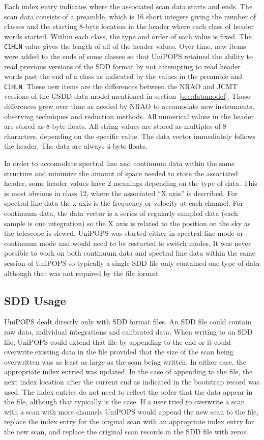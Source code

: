 \documentclass[final,authoryear,5p,times,twocolumn]{elsarticle}
\begin{document}
Each index entry indicates where the associated scan data starts and
ends.  The scan data consists of a preamble, which is 16 short
integers giving the number of classes and the starting 8-byte location
in the header where each class of header words started.  Within each
class, the type and order of each value is fixed.  The \texttt{C1HLN}
value gives the length of all of the header values.  Over time, new
items were added to the ends of some classes so that UniPOPS retained
the ability to read previous versions of the SDD format by not
attempting to read header words past the end of a class as indicated
by the values in the preamble and \texttt{C1HLN}.  These new items are the 
differences between the NRAO and JCMT versions of the GSDD data model
mentioned in section~\ref{sec:datamodel}.  Those differences grew over time
as needed by NRAO to accomodate new instruments, observing techniques and
reduction methods. All numerical
values in the header are stored as 8-byte floats.  All string values
are stored as multiples of 8 characters, depending on the specific
value.  The data vector immediately follows the header.  The data are
always 4-byte floats.

In order to accomodate spectral line and continuum data within the
same structure and minimize the amount of space needed to store the
associated header, some header values have 2 meanings depending on the
type of data.  This is most obvious in class 12, where the associated
``X axis'' is described.  For spectral line data the x-axis is the
frequency or velocity at each channel.  For
continuum data, the data vector is a series of regularly sampled
data (each sample is one integration) so the X axis is related to
the position on the sky as the telescope is slewed.  UniPOPS was
started either in spectral line mode or continuum mode and would need
to be restarted to switch modes.  It was never possible to work on
both continuum data and spectral line data within the same session of
UniPOPS so typically a single SDD file only contained one type of
data although that was not required by the file format.

\subsection{SDD Usage}

UniPOPS dealt directly only with SDD format files.  An SDD file could
contain raw data, individual integrations and calibrated data. When
writing to an SDD file, UniPOPS could extend that file by appending to
the end or it could overwrite existing data in the file provided that
the size of the scan being overwritten was as least as large as the
scan being written.  In either case, the appropriate index entried was
updated.  In the case of appending to the file, the next index
location after the current end as indicated in the bootstrap record
was used.  The index entries do not need to reflect the order that the
data appear in the file, although that typically is the case.  If a
user tried to overwrite a scan with a scan with more channels UniPOPS
would append the new scan to the file, replace the index entry for the
original scan with an appropriate index entry for the new scan, and
replace the original scan records in the SDD file with zeros.
\end{document}
